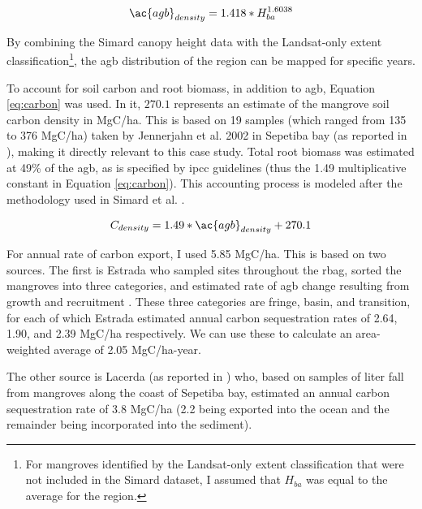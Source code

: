 \begin{equation}
\label{eq:allo}
\ac{agb}_{density} = 1.418 * H_{ba}^{1.6038}
\end{equation}

By combining the Simard canopy height data with the Landsat-only extent classification\footnote{For mangroves identified by the Landsat-only extent classification that were not included in the Simard dataset, I assumed that $H_{ba}$ was equal to the average for the region.}, the \ac{agb} distribution of the region can be mapped for specific years.

To account for soil carbon and root biomass, in addition to \ac{agb}, Equation \ref{eq:carbon} was used. In it, $270.1$ represents an estimate of the mangrove soil carbon density in MgC/ha. This is based on 19 samples (which ranged from 135 to 376 MgC/ha) taken by Jennerjahn et al. 2002 \cite{jennerjahnRelevanceMangrovesProduction2002} in Sepetiba bay (as reported in \cite{kristensenOrganicCarbonDynamics2008, atwoodGlobalPatternsMangrove2017}), making it directly relevant to this case study.  Total root biomass was estimated at 49\% of the \ac{agb}, as is specified by \ac{ipcc} guidelines \cite{takahiko2013Supplement20062014} (thus the 1.49 multiplicative constant in Equation \ref{eq:carbon}). This accounting process is modeled after the methodology used in Simard et al. \cite{simardMangroveCanopyHeight2019}.

\begin{equation}
\label{eq:carbon}
C_{density} = 1.49 * \ac{agb}_{density} + 270.1 
\end{equation}

For annual rate of carbon export, I used 5.85 MgC/ha. This is based on two sources. The first is Estrada who sampled sites throughout the \ac{rbag}, sorted the mangroves into three categories, and estimated rate of \ac{agb} change resulting from growth and recruitment \cite{estrada2013analise}. These three categories are fringe, basin, and transition, for each of which Estrada estimated annual carbon sequestration rates of 2.64, 1.90, and 2.39 MgC/ha respectively. We can use these to calculate an area-weighted average of 2.05 MgC/ha-year. 

The other source is Lacerda \cite{lacerda1992carbon} (as reported in \cite{jennerjahnRelevanceMangrovesProduction2002}) who, based on samples of liter fall from mangroves along the coast of Sepetiba bay, estimated an annual carbon sequestration rate of 3.8 MgC/ha (2.2 being exported into the ocean and the remainder being incorporated into the sediment).

